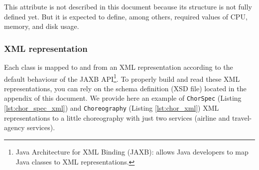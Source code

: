\documentclass[a4paper, 10pt]{article}
\begin{document}
This attribute is not described in this document because its structure is not fully defined yet. But it is expected to define, among others, required values of CPU, memory, and disk usage.

\subsubsection*{XML representation}

Each class is mapped to and from an XML representation according to the default behaviour of the JAXB API\footnote{Java Architecture for XML Binding (JAXB): allows Java developers to map Java classes to XML representations.}. 
To properly build and read these XML representations, you can rely on the schema definition (XSD file) located in the appendix of this document. We provide here an example of \verb!ChorSpec! (Listing \ref{lst:chor_spec_xml}) and \verb!Choreography! (Listing \ref{lst:chor_xml}) XML representations to a little choreography with just two services (airline and travel-agency services). 
\end{document}
